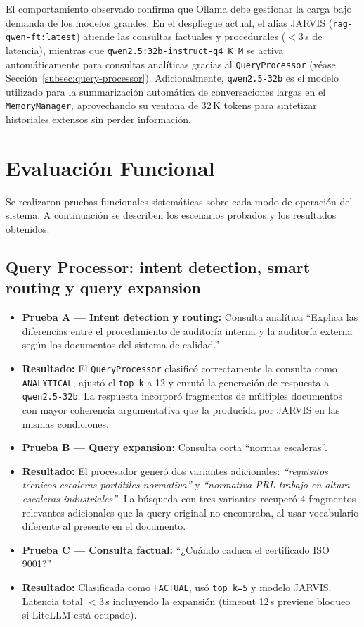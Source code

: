 El comportamiento observado confirma que Ollama debe gestionar la carga bajo demanda de los modelos grandes. En el despliegue actual, el alias JARVIS (\texttt{rag-qwen-ft:latest}) atiende las consultas factuales y procedurales ($<3$\,s de latencia), mientras que \texttt{qwen2.5:32b-instruct-q4\_K\_M} se activa autom\'aticamente para consultas anal\'iticas gracias al \texttt{QueryProcessor} (v\'ease Secci\'on~\ref{subsec:query-processor}). Adicionalmente, \texttt{qwen2.5-32b} es el modelo utilizado para la summarizaci\'on autom\'atica de conversaciones largas en el \texttt{MemoryManager}, aprovechando su ventana de 32\,K tokens para sintetizar historiales extensos sin perder informaci\'on.

\section{Evaluación Funcional}

Se realizaron pruebas funcionales sistemáticas sobre cada modo de operación del sistema. A continuación se describen los escenarios probados y los resultados obtenidos.

\subsection{Query Processor: intent detection, smart routing y query expansion}

\begin{itemize}
    \item \textbf{Prueba A --- Intent detection y routing:} Consulta analítica ``Explica las diferencias entre el procedimiento de auditoría interna y la auditoría externa según los documentos del sistema de calidad.''
    \item \textbf{Resultado:} El \texttt{QueryProcessor} clasificó correctamente la consulta como \texttt{ANALYTICAL}, ajustó el \texttt{top\_k} a 12 y enrutó la generación de respuesta a \texttt{qwen2.5-32b}. La respuesta incorporó fragmentos de múltiples documentos con mayor coherencia argumentativa que la producida por JARVIS en las mismas condiciones.
    \item \textbf{Prueba B --- Query expansion:} Consulta corta ``normas escaleras''.
    \item \textbf{Resultado:} El procesador generó dos variantes adicionales: \textit{``requisitos técnicos escaleras portátiles normativa''} y \textit{``normativa PRL trabajo en altura escaleras industriales''}. La búsqueda con tres variantes recuperó 4 fragmentos relevantes adicionales que la query original no encontraba, al usar vocabulario diferente al presente en el documento.
    \item \textbf{Prueba C --- Consulta factual:} ``¿Cuándo caduca el certificado ISO 9001?''
    \item \textbf{Resultado:} Clasificada como \texttt{FACTUAL}, usó \texttt{top\_k=5} y modelo JARVIS. Latencia total $<3$\,s incluyendo la expansión (timeout 12\,s previene bloqueo si LiteLLM está ocupado).
\end{itemize}

